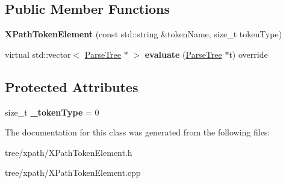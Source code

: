 \subsection*{Public Member Functions}
\begin{DoxyCompactItemize}
\item 
\mbox{\label{classantlr4_1_1tree_1_1xpath_1_1XPathTokenElement_ae1dbccadf81eb6c1df972c39b260427a}} 
{\bfseries X\+Path\+Token\+Element} (const std\+::string \&token\+Name, size\+\_\+t token\+Type)
\item 
\mbox{\label{classantlr4_1_1tree_1_1xpath_1_1XPathTokenElement_a3d082a0df64b7196852d7f0aca857ff8}} 
virtual std\+::vector$<$ \hyperlink{classantlr4_1_1tree_1_1ParseTree}{Parse\+Tree} $\ast$ $>$ {\bfseries evaluate} (\hyperlink{classantlr4_1_1tree_1_1ParseTree}{Parse\+Tree} $\ast$t) override
\end{DoxyCompactItemize}
\subsection*{Protected Attributes}
\begin{DoxyCompactItemize}
\item 
\mbox{\label{classantlr4_1_1tree_1_1xpath_1_1XPathTokenElement_af5aab74f2571678fbb6dec387ca305f6}} 
size\+\_\+t {\bfseries \+\_\+token\+Type} = 0
\end{DoxyCompactItemize}


The documentation for this class was generated from the following files\+:\begin{DoxyCompactItemize}
\item 
tree/xpath/X\+Path\+Token\+Element.\+h\item 
tree/xpath/X\+Path\+Token\+Element.\+cpp\end{DoxyCompactItemize}
